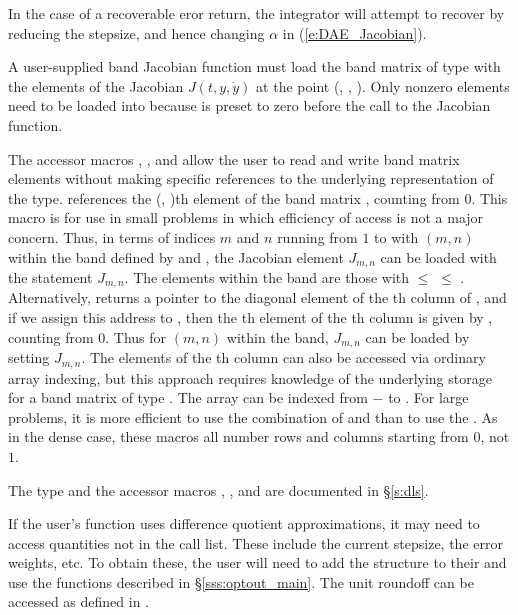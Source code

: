 {{  In the case of a recoverable eror return, 
  the integrator will attempt to recover by reducing the stepsize,
  and hence changing $\alpha$ in (\ref{e:DAE_Jacobian}).
}
{
  A user-supplied band Jacobian function must load the band matrix 
  of type  with the elements of the Jacobian $J(t,y,\dot{y})$ at the
  point (, , ).  Only nonzero elements need to be loaded into
   because  is preset to zero before the call to the
  Jacobian function.  

  The accessor macros , , and  
  allow the user to read and write band matrix elements without making specific 
  references to the underlying representation of the  type.
   references the (, )th element of the 
  band matrix , counting from $0$.
  This macro is for use in small problems in which efficiency of access is not
  a major concern.  Thus, in terms of indices $m$ and $n$ running from $1$ to
   with $(m,n)$ within the band defined by  and
  , the Jacobian element $J_{m,n}$ can be loaded with the 
  statement  $J_{m,n}$. The elements within
  the band are those with  $\le$  $\le$ .
  Alternatively,  returns a pointer to the diagonal element
  of the th column of , and if we assign this address to 
  , then the th element of the th column is
  given by , counting from $0$.
  Thus for $(m,n)$ within the band, $J_{m,n}$ can be loaded by setting 
    $J_{m,n}$.
  The elements of the th column can also be accessed
  via ordinary array indexing, but this approach requires knowledge of
  the underlying storage for a band matrix of type .  
  The array  can be indexed from $-$ to .
  For large problems, it is more efficient to use the combination of
   and  than to use the
  .  As in the dense case, these macros all number rows
  and columns starting from $0$, not $1$.  

  The  type and the accessor macros , , and
   are documented in \S\ref{s:dls}.

  If the user's  function uses difference quotient approximations,
  it may need to access quantities not in the call list. These include the current
  stepsize, the error weights, etc. 
  To obtain these, the user will need to add the  
  structure to their  and use the  
  functions described in
  \S\ref{sss:optout_main}. The unit roundoff can be accessed
  as  defined in .

}}
